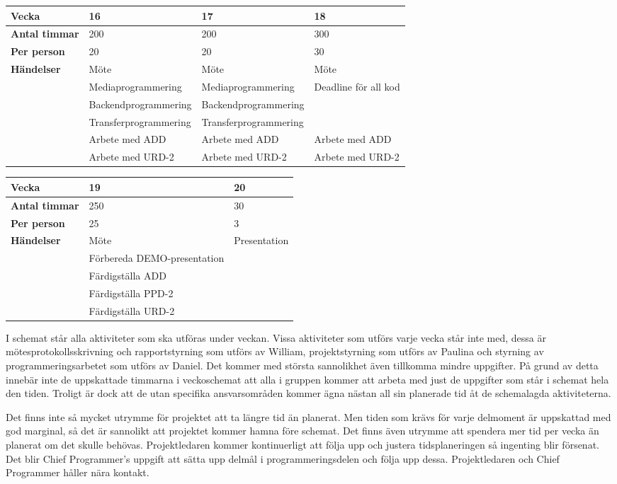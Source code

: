 \begin{tabular}{ | p{65pt} || p{110pt} | p{110pt} | p{110pt} |}
  \hline
  \textbf{Vecka} & 16 & 17 & 18  \\ \hline
  \textbf{Antal timmar} & 200 & 200 & 300 \\ \hline
  \textbf{Per person} & 20 & 20 & 30 \\ \hline
  \textbf{Händelser} & Möte & Möte & Möte \\ \hline
  & Mediaprogrammering & Mediaprogrammering & Deadline för all kod \\ \hline
  & Backendprogrammering & Backendprogrammering &  \\ \hline
  & Transferprogrammering & Transferprogrammering &  \\ \hline
  & Arbete med ADD & Arbete med ADD & Arbete med ADD \\ \hline
  & Arbete med URD-2 & Arbete med URD-2 & Arbete med URD-2\\ \hline
\end{tabular}

\begin{tabular}{ | p{65pt} || p{110pt} | p{233pt} |}
  \hline
  \textbf{Vecka} & 19 & 20 \\ \hline
  \textbf{Antal timmar} & 250 & 30 \\ \hline
  \textbf{Per person} & 25 & 3 \\ \hline
  \textbf{Händelser} & Möte & Presentation\\ \hline
  & Förbereda DEMO-presentation &\\ \hline
  & Färdigställa ADD &\\ \hline
  & Färdigställa PPD-2 &\\ \hline
  & Färdigställa URD-2 &\\ \hline
\end{tabular}

I schemat står alla aktiviteter som ska utföras under veckan. Vissa aktiviteter som utförs varje vecka står inte med, dessa är mötesprotokollsskrivning och rapportstyrning som utförs av William, projektstyrning som utförs av Paulina och styrning av programmeringsarbetet som utförs av Daniel. Det kommer med största sannolikhet även tillkomma mindre uppgifter. På grund av detta innebär inte de uppskattade timmarna i veckoschemat att alla i gruppen kommer att arbeta med just de uppgifter som står i schemat hela den tiden. Troligt är dock att de utan specifika ansvarsområden kommer ägna nästan all sin planerade tid åt de schemalagda aktiviteterna. 

Det finns inte så mycket utrymme för projektet att ta längre tid än planerat. Men tiden som krävs för varje delmoment är uppskattad med god marginal, så det är sannolikt att projektet kommer hamna före schemat. Det finns även utrymme att spendera mer tid per vecka än planerat om det skulle behövas. Projektledaren kommer kontinuerligt att följa upp och justera tidsplaneringen så ingenting blir försenat. Det blir Chief Programmer’s uppgift att sätta upp delmål i programmeringsdelen och följa upp dessa. Projektledaren och Chief Programmer håller nära kontakt.
